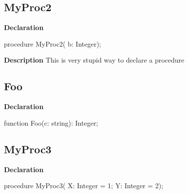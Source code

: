 \documentclass{report}
\begin{document}
\subsection*{MyProc2}
\begin{list}{}{
\setlength{\itemindent}{0cm}
\setlength{\listparindent}{0cm}
\setlength{\leftmargin}{\evensidemargin}
\addtolength{\leftmargin}{\tmplength}
\settowidth{\labelsep}{X}
\addtolength{\leftmargin}{\labelsep}
\setlength{\labelwidth}{\tmplength}
}
\begin{flushleft}
\item[\textbf{Declaration}\hfill]
\begin{ttfamily}
procedure MyProc2( b: Integer);\end{ttfamily}


\end{flushleft}
\par
\item[\textbf{Description}]
This is very stupid way to declare a procedure

\end{list}
\subsection*{Foo}
\begin{list}{}{
\setlength{\itemindent}{0cm}
\setlength{\listparindent}{0cm}
\setlength{\leftmargin}{\evensidemargin}
\addtolength{\leftmargin}{\tmplength}
\settowidth{\labelsep}{X}
\addtolength{\leftmargin}{\labelsep}
\setlength{\labelwidth}{\tmplength}
}
\begin{flushleft}
\item[\textbf{Declaration}\hfill]
\begin{ttfamily}
function Foo(c: string): Integer;\end{ttfamily}


\end{flushleft}
\end{list}
\subsection*{MyProc3}
\begin{list}{}{
\setlength{\itemindent}{0cm}
\setlength{\listparindent}{0cm}
\setlength{\leftmargin}{\evensidemargin}
\addtolength{\leftmargin}{\tmplength}
\settowidth{\labelsep}{X}
\addtolength{\leftmargin}{\labelsep}
\setlength{\labelwidth}{\tmplength}
}
\begin{flushleft}
\item[\textbf{Declaration}\hfill]
\begin{ttfamily}
procedure MyProc3( X: Integer = 1; Y: Integer = 2);\end{ttfamily}


\end{flushleft}
\end{list}
\end{document}

